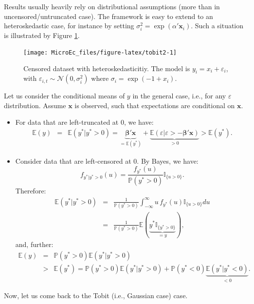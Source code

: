 \documentclass[
  12pt,
]{book}
\theoremstyle{definition}
\theoremstyle{definition}
\theoremstyle{definition}
\theoremstyle{definition}
\theoremstyle{remark}
\begin{document}
Results usually heavily rely on distributional assumptions (more than in uncensored/untruncated case). The framework is easy to extend to an heteroskedastic case, for instance by setting \(\sigma_i^2=\exp(\alpha'\mathbf{x}_i)\). Such a situation is illustrated by Figure \ref{fig:tobit2}.

\begin{figure}
\texttt{[image: MicroEc\_files/figure-latex/tobit2-1]} \caption{Censored dataset with heteroskedasticitiy. The model is $y_i = x_i + \varepsilon_i$, with $\varepsilon_{i,t} \sim \mathcal{N}(0,\sigma_i^2)$ where $\sigma_i = \exp(-1 + x_i)$.}\label{fig:tobit2}
\end{figure}

Let us consider the conditional means of \(y\) in the general case, i.e., for any \(\varepsilon\) distribution. Assume \(\mathbf{x}\) is observed, such that expectations are conditional on \(\mathbf{x}\).

\begin{itemize}
\item
  For data that are left-truncated at 0, we have:
  \begin{eqnarray*}
  \mathbb{E}(y) &=& \mathbb{E}(y^*|y^*>0) = \underbrace{\boldsymbol\beta'\mathbf{x}}_{=\mathbb{E}(y^*)} + \underbrace{\mathbb{E}(\varepsilon|\varepsilon>-\boldsymbol\beta'\mathbf{x})}_{>0} > \mathbb{E}(y^*).
  \end{eqnarray*}
\item
  Consider data that are left-censored at 0. By Bayes, we have:
  \[
  f_{y^*|y^*>0}(u) = \frac{f_{y^*}(u)}{\mathbb{P}(y^*>0)}\mathbb{I}_{\{u>0\}}.
  \]
  Therefore:
  \begin{eqnarray*}
  \mathbb{E}(y^*|y^*>0) &=& \frac{1}{\mathbb{P}(y^*>0)} \int_{-\infty}^\infty u\, f_{y^*}(u)\mathbb{I}_{\{u>0\}} du \\
  &=&  \frac{1}{\mathbb{P}(y^*>0)} \mathbb{E}(\underbrace{y^*\mathbb{I}_{\{y^*>0\}}}_{=y}),
  \end{eqnarray*}
  and, further:
  \begin{eqnarray*}
  \mathbb{E}(y) &=&  \mathbb{P}(y^*>0)\mathbb{E}(y^*|y^*>0)\\
  &>&  \mathbb{E}(y^*) =  \mathbb{P}(y^*>0)\mathbb{E}(y^*|y^*>0) +  \mathbb{P}(y^*<0)\underbrace{\mathbb{E}(y^*|y^*<0)}_{<0}.
  \end{eqnarray*}
\end{itemize}

Now, let us come back to the Tobit (i.e., Gaussian case) case.
\end{document}
